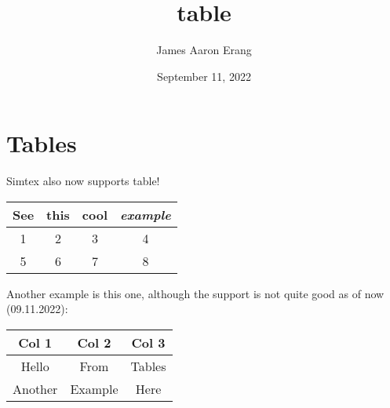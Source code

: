 \documentclass[12pt, UTF8]{article}
\title{table}
\author{James Aaron Erang}
\date{September 11, 2022}
\begin{document}
	\maketitle
	
	\section{Tables}
	
	Simtex also now supports table!
	
	\begin{center}
		\begin{tabular}{| c | c | c | c |}		\hline
			See & \textbf{this} & cool & \textit{example} \\
			\hline
			1 & 2 & 3 & 4 \\
			5 & 6 & 7 & 8 \\		\hline
		\end{tabular}
	\end{center}
	
	Another example is this one, although the support is not quite good as of now (09.11.2022):
	
	\begin{center}
		\begin{tabular}{| c | c | c |}		\hline
			Col 1 & Col 2 & Col 3 \\
			\hline
			Hello & From & Tables \\
			Another & Example & Here \\		\hline
		\end{tabular}
	\end{center}
\end{document}
